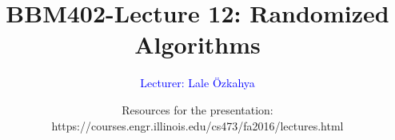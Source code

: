 \documentclass[xcolor=dvipsnames,smaller]{beamer}
\title[BBM402-Lecture 12: Randomized Algorithms]
{BBM402-Lecture 12: Randomized Algorithms}
\author{
\vspace{2cm}
\textcolor{Blue}{\large{Lecturer: Lale \"Ozkahya}}}
\date{
\footnotesize{
Resources for the presentation:\\
https://courses.engr.illinois.edu/cs473/fa2016/lectures.html}}
\begin{document}
\newtheorem{thm}[theorem] {Theorem}
\newtheorem{lem}[theorem]{Lemma}
\newtheorem{cor}[theorem]{Corollary}
\newtheorem{prp}[theorem]{Proposition}
\newtheorem{clm}[theorem]{Claim}
\newtheorem{conj}[theorem]{Conjecture}
\newtheorem{remark}[theorem]{Remark}
\newtheorem{construction}[theorem]{Construction}

\def\EE{\mathcal{E}}


\def\tr{\textcolor{Red}}
\def\tb{\textcolor{Blue}}
\def\vs{\vspace{0.5cm}}

\begin{frame}
\titlepage
\end{frame}

\normalsize{




}
\end{document}

